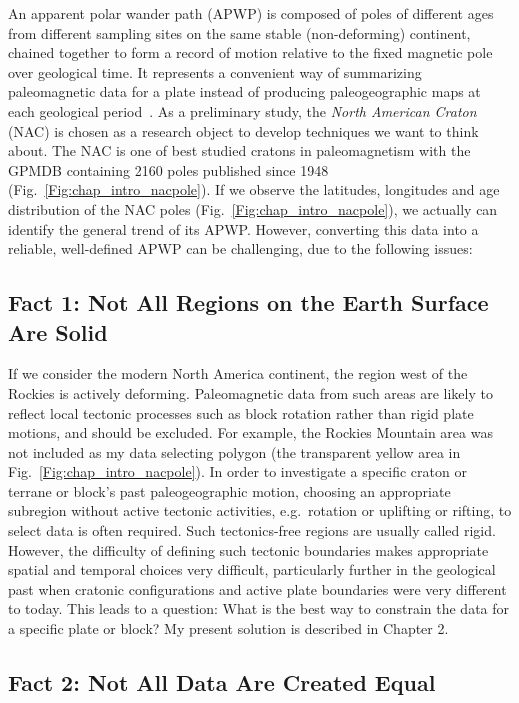 An apparent polar wander path (APWP) is composed of poles of different ages
from different sampling sites on the same stable (non-deforming) continent,
chained together to form a record of motion relative to the fixed magnetic pole
over geological time. It represents a convenient way of summarizing
paleomagnetic data for a plate instead of producing paleogeographic maps at
each geological period~\cite{T08}. As a preliminary study, the \emph{North
American Craton} (NAC) is chosen as a research object to develop techniques we
want to think about. The NAC is one of best studied cratons in paleomagnetism
with the GPMDB containing 2160 poles published since 1948
(Fig.~\ref{Fig:chap_intro_nacpole}). If we observe the latitudes, longitudes and
age distribution of the NAC poles (Fig.~\ref{Fig:chap_intro_nacpole}), we
actually can identify the general trend of its APWP\@. However, converting this
data into a reliable, well-defined APWP can be challenging, due to the following
issues:

\subsection{Fact 1: Not All Regions on the Earth Surface Are Solid}

If we consider the modern North America continent, the region west of the
Rockies is actively deforming. Paleomagnetic data from such areas are likely to
reflect local tectonic processes such as block rotation rather than rigid plate
motions, and should be excluded. For example, the Rockies Mountain area was not
included as my data selecting polygon (the transparent yellow area in
Fig.~\ref{Fig:chap_intro_nacpole}). In order to investigate a specific craton or
terrane or block's past paleogeographic motion, choosing an appropriate
subregion without active tectonic activities, e.g.\ rotation or uplifting or
rifting, to select data is often required. Such tectonics-free regions are
usually called rigid. However, the difficulty of defining such tectonic
boundaries makes appropriate spatial and temporal choices very difficult,
particularly further in the geological past when cratonic configurations and
active plate boundaries were very different to today. This leads to a question:
What is the best way to constrain the data for a specific plate or block? My
present solution is described in Chapter 2.

\subsection{Fact 2: Not All Data Are Created Equal}

